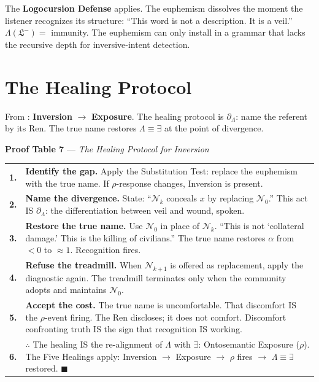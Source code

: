 \documentclass[11pt, oneside]{article}
\theoremstyle{definition}
\begin{document}
The \textbf{Logocursion Defense} applies. The euphemism dissolves the moment the listener recognizes its structure: ``This word is not a description. It is a veil.'' $\Lambda(\mathfrak{L}^-) = $ immunity. The euphemism can only install in a grammar that lacks the recursive depth for inversive-intent detection.

\section{The Healing Protocol}

From \cite{codex2}: \textbf{Inversion} $\to$ \textbf{Exposure}. The healing protocol is $\partial_\Lambda$: name the referent by its Ren. The true name restores $\Lambda \equiv \exists$ at the point of divergence.

\textbf{Proof Table 7} --- \textit{The Healing Protocol for Inversion}

{\small
\noindent\begin{tabular}{r p{}}
\textbf{1.} & \textbf{Identify the gap.} Apply the Substitution Test: replace the euphemism with the true name. If $\rho$-response changes, Inversion is present. \\[0.3em]
\textbf{2.} & \textbf{Name the divergence.} State: ``$\mathcal{N}_k$ conceals $x$ by replacing $\mathcal{N}_0$.'' This act IS $\partial_\Lambda$: the differentiation between veil and wound, spoken. \\[0.3em]
\textbf{3.} & \textbf{Restore the true name.} Use $\mathcal{N}_0$ in place of $\mathcal{N}_k$. ``This is not `collateral damage.' This is the killing of civilians.'' The true name restores $\alpha$ from $< 0$ to $\approx 1$. Recognition fires. \\[0.3em]
\textbf{4.} & \textbf{Refuse the treadmill.} When $\mathcal{N}_{k+1}$ is offered as replacement, apply the diagnostic again. The treadmill terminates only when the community adopts and maintains $\mathcal{N}_0$. \\[0.3em]
\textbf{5.} & \textbf{Accept the cost.} The true name is uncomfortable. That discomfort IS the $\rho$-event firing. The Ren discloses; it does not comfort. Discomfort confronting truth IS the sign that recognition IS working. \\[0.3em]
\textbf{6.} & $\therefore$ The healing IS the re-alignment of $\Lambda$ with $\exists$: Ontosemantic Exposure ($\rho$). The Five Healings \cite{codex2} apply: Inversion $\to$ Exposure $\to$ $\rho$ fires $\to$ $\Lambda \equiv \exists$ restored. \hfill $\blacksquare$ \\[0.3em]
\end{tabular}
}
\end{document}
